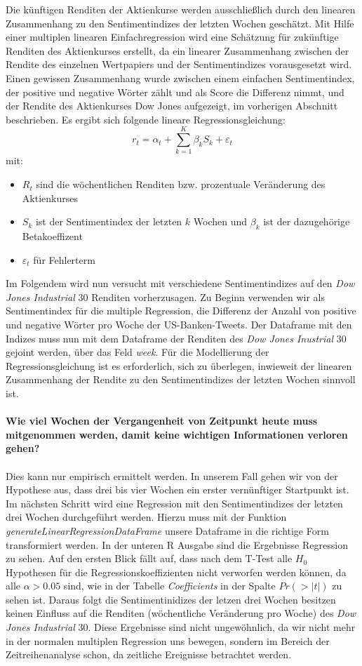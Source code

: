 Die künftigen Renditen der Aktienkurse werden ausschließlich
durch den linearen Zusammenhang zu den Sentimentindizes der letzten Wochen geschätzt. Mit Hilfe einer multiplen linearen Einfachregression wird eine Schätzung für zukünftige Renditen des Aktienkurses erstellt, da ein linearer Zusammenhang zwischen der Rendite des einzelnen Wertpapiers und der Sentimentindizes vorausgesetzt wird. Einen gewissen Zusammenhang wurde zwischen einem einfachen Sentimentindex, der positive und negative Wörter zählt und als Score die Differenz nimmt, und der Rendite des Aktienkurses  Dow Jones aufgezeigt, im  vorherigen Abschnitt beschrieben. Es ergibt sich folgende lineare Regressionsgleichung:
\begin{equation}
r_{t}=\alpha_{t}+ \sum_{k=1}^{K} \beta_{k} S_{k}+\varepsilon_{t}
\end{equation}
mit:
\begin{itemize}
	\item  $R_{t}$ sind die wöchentlichen Renditen bzw. prozentuale Veränderung des Aktienkurses
	\item $S_{k}$ ist der Sentimentindex der letzten $k$ Wochen und $\beta_{k}$ ist der dazugehörige Betakoeffizent
	\item $\varepsilon_{t}$ für  Fehlerterm 
\end{itemize}
Im Folgendem wird nun versucht mit verschiedene Sentimentindizes auf den \textit{Dow Jones Industrial} $30$ Renditen vorherzusagen. Zu Beginn verwenden wir als Sentimentindex für die multiple Regression, die Differenz der Anzahl von positive und negative Wörter pro Woche der US-Banken-Tweets. Der Dataframe mit den Indizes muss nun mit dem Dataframe der Renditen  des \textit{Dow Jones Inustrial} $30$ gejoint werden, über das Feld \textit{week}. Für die Modellierung der Regressionsgleichung ist es erforderlich, sich zu überlegen, inwieweit der linearen Zusammenhang der Rendite zu den Sentimentindizes der letzten Wochen sinnvoll ist. \\
\\
\textbf{Wie viel Wochen der Vergangenheit von Zeitpunkt heute muss mitgenommen werden, damit keine wichtigen Informationen verloren gehen?} 
\\
\\
Dies kann nur empirisch ermittelt werden. In unserem Fall gehen wir von der Hypothese aus, dass drei bis vier Wochen ein erster vernünftiger Startpunkt ist. Im nächsten Schritt wird eine Regression mit den Sentimentindizes der letzten drei Wochen durchgeführt werden. Hierzu muss mit der Funktion \textit{generateLinearRegressionDataFrame} unsere Dataframe in die richtige Form transformiert werden. In der unteren R Ausgabe sind die Ergebnisse Regression zu sehen. Auf den ersten Blick fällt auf, dass nach dem T-Test alle $H_{0}$ Hypothesen für die Regressionskoeffizienten nicht verworfen werden können, da alle $\alpha>0.05$ sind, wie in der Tabelle \textit{Coefficients} in der Spalte $Pr(>|t|)$ zu sehen ist. Daraus folgt die Sentimentinidizes der letzen drei Wochen besitzen keinen Einfluss auf die Renditen (wöchentliche Veränderung pro Woche)  des \textit{Dow Jones Industrial} $30$. Diese Ergebnisse sind nicht ungewöhnlich, da wir nicht mehr in der normalen multiplen Regression uns bewegen, sondern im Bereich der Zeitreihenanalyse schon, da zeitliche Ereignisse betrachtet werden.
